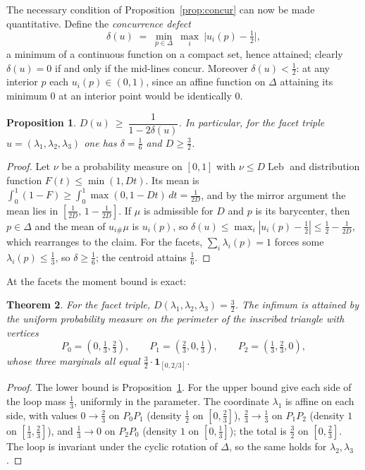 \documentclass[11pt,reqno]{amsart}
\theoremstyle{plain}
\newtheorem{theorem}{Theorem}[section]
\newtheorem{proposition}[theorem]{Proposition}
\theoremstyle{definition}
\theoremstyle{remark}
\newcommand{\Leb}{\operatorname{Leb}}
\begin{document}
The necessary condition of Proposition~\ref{prop:concur} can now be made
quantitative. Define the \emph{concurrence defect}
\begin{equation}\label{eq:cdefect}
\delta(u)\;=\;\min_{p\in\Delta}\ \max_{i}\ \bigl|u_i(p)-\tfrac12\bigr|,
\end{equation}
a minimum of a continuous function on a compact set, hence attained; clearly
$\delta(u)=0$ if and only if the mid-lines concur. Moreover $\delta(u)<\tfrac12$:
at any interior $p$ each $u_i(p)\in(0,1)$, since an affine function on $\Delta$
attaining its minimum $0$ at an interior point would be identically $0$.

\begin{proposition}\label{prop:moment}
$D(u)\ \ge\ \dfrac1{1-2\delta(u)}$. In particular, for the facet triple
$u=(\lambda_1,\lambda_2,\lambda_3)$ one has $\delta=\tfrac16$ and $D\ge\tfrac32$.
\end{proposition}

\begin{proof}
Let $\nu$ be a probability measure on $[0,1]$ with $\nu\le D\Leb$ and
distribution function $F(t)\le\min(1,Dt)$. Its mean is
$\int_0^1(1-F)\ge\int_0^1\max(0,1-Dt)\,dt=\tfrac1{2D}$, and by the mirror
argument the mean lies in $[\tfrac1{2D},\,1-\tfrac1{2D}]$. If $\mu$ is
admissible for $D$ and $p$ is its barycenter, then $p\in\Delta$ and the mean of
$u_{i\#}\mu$ is $u_i(p)$, so
$\delta(u)\le\max_i|u_i(p)-\tfrac12|\le\tfrac12-\tfrac1{2D}$, which rearranges
to the claim. For the facets, $\sum_i\lambda_i(p)=1$ forces some
$\lambda_i(p)\le\tfrac13$, so $\delta\ge\tfrac16$; the centroid attains
$\tfrac16$.
\end{proof}

At the facets the moment bound is exact:

\begin{theorem}\label{thm:facetdefect}
For the facet triple, $D(\lambda_1,\lambda_2,\lambda_3)=\tfrac32$. The infimum
is attained by the uniform probability measure on the perimeter of the inscribed
triangle with vertices
\[
P_0=(0,\tfrac13,\tfrac23),\qquad P_1=(\tfrac23,0,\tfrac13),\qquad
P_2=(\tfrac13,\tfrac23,0),
\]
whose three marginals all equal $\tfrac32\cdot\mathbf 1_{[0,2/3]}$.
\end{theorem}

\begin{proof}
The lower bound is Proposition~\ref{prop:moment}. For the upper bound give each
side of the loop mass $\tfrac13$, uniformly in the parameter. The coordinate
$\lambda_1$ is affine on each side, with values $0\to\tfrac23$ on $P_0P_1$
(density $\tfrac12$ on $[0,\tfrac23]$), $\tfrac23\to\tfrac13$ on $P_1P_2$
(density $1$ on $[\tfrac13,\tfrac23]$), and $\tfrac13\to0$ on $P_2P_0$ (density
$1$ on $[0,\tfrac13]$); the total is $\tfrac32$ on $[0,\tfrac23]$. The loop is
invariant under the cyclic rotation of $\Delta$, so the same holds for
$\lambda_2,\lambda_3$.
\end{proof}
\end{document}
